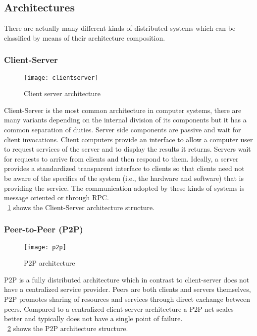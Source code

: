 \subsection{Architectures}
\par
There are actually many different kinds of distributed systems which can be classified by means of their architecture composition.
\subsubsection{Client-Server}
\begin{figure}[h]
	\centering
	\texttt{[image: clientserver]}
	\caption{Client server architecture}
	\label{fig:2.12}
\end{figure} 
 Client-Server is the most common architecture in computer systems, there are many variants depending on the internal division of its components but it has a common separation of duties. Server side components are passive and wait for client invocations. Client computers provide an interface to allow a computer user to request services of the server and to display the results it returns. Servers wait for requests to arrive from clients and then respond to them. Ideally, a server provides a standardized transparent interface to clients so that clients need not be aware of the specifics of the system (i.e., the hardware and software) that is providing the service. The communication adopted by these kinds of systems is message oriented or through RPC.\\ \figurename~\ref{fig:2.12} shows the Client-Server architecture structure.\\
\subsubsection{Peer-to-Peer (P2P)}\label{P2P}
\begin{figure}[ht!]
	\centering
	\texttt{[image: p2p]}
	\caption{P2P architecture}
	\label{fig:2.13}
\end{figure} 

P2P is a fully distributed architecture which in contrast to client-server does not have a centralized service provider. Peers are both clients and servers themselves, P2P promotes sharing of resources and services through direct exchange between peers. Compared to a centralized client-server architecture a P2P net scales better and typically does not have a single point of failure. \\
\figurename~\ref{fig:2.13} shows the P2P architecture structure.\\\\\\\\\\

